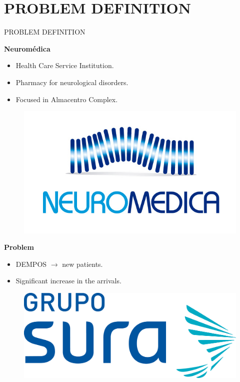 \section{PROBLEM DEFINITION}
\begin{frame}{PROBLEM DEFINITION}
\begin{multicols}{2}
\textbf{Neuromédica}
\begin{itemize}
    \item Health Care Service Institution.
    \item Pharmacy for neurological disorders.
    \item Focused in Almacentro Complex.
\end{itemize}
\begin{figure}
    \centering
    \includegraphics[width=\textwidth/2]{images/logo-neuromedica.jpg}
\end{figure}
\columnbreak
\textbf{Problem}
\begin{itemize}
    \item DEMPOS $\rightarrow$ new patients.
    \item Significant increase in the arrivals.
\end{itemize}
\begin{figure}
    \centering
    \includegraphics[width=\textwidth/2]{images/GRUPO-_SURA.png}
\end{figure}
\end{multicols}
\end{frame}

